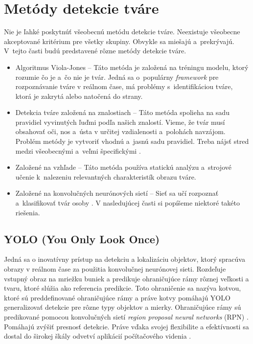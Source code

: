 \section{Metódy detekcie tváre}
Nie je ľahké poskytnúť všeobecnú metódu detekcie tváre. Neexistuje všeobecne akceptované kritérium pre všetky skupiny. Obvykle sa miešajú a~prekrývajú. V~tejto časti budú predstavené rôzne metódy detekcie tváre.
\begin{itemize}
    \item Algoritmus Viola-Jones \cite{viola_jones} -- Táto metóda je založená na tréningu modelu, ktorý rozumie čo je a~čo nie je tvár. Jedná sa o~populárny \textit{framework} pre rozpoznávanie tváre v reálnom čase, má problémy s~identifikáciou tváre, ktorá je zakrytá alebo natočená do strany.
    \item Detekcia tváre založená na znalostiach -- Táto metóda spolieha na sadu pravidiel vyvinutých ľuďmi podľa našich znalostí. Vieme, že tvár musí obsahovať oči, nos a~ústa v určitej vzdialenosti a~polohách navzájom. Problém metódy je vytvoriť vhodnú a~jasnú sadu pravidiel. Treba nájsť stred medzi všeobecnými a~veľmi špecifickými \cite{face_rec_med}.
    \item Založené na vzhľade -- Táto metóda používa statickú analýzu a~strojové učenie k~nalezeniu relevantných charakteristík obrazu tváre.
    \item Založené na konvolučných neurónových sietí -- Sieť sa učí rozpoznať a~klasifikovať tvár osoby \cite{face_rec_med2,face_detect}. V nasledujúcej časti si popíšeme niektoré takéto riešenia.
\end{itemize}

\subsection{YOLO (You Only Look Once)}
Jedná sa o inovatívny prístup na detekciu a lokalizáciu objektov, ktorý spracúva obrazy v reálnom čase za použitia konvolučnej neurónovej sieti. Rozdeľuje vstupný obraz na mriežku buniek a predikuje ohraničujúce rámy rôznej veľkosti a tvaru, ktoré slúžia ako referencia predikcie. Toto ohraničenie sa nazýva kotvou, ktoré sú preddefinované ohraničujúce rámy a práve kotvy pomáhajú YOLO generalizovať detekcie pre rôzne typy objektov a mierky. Ohraničujúce rámy sú predikované pomocou konvolučných sietí \textit{region proposal neural networks} (RPN) \cite{rpn}. Pomáhajú zvýšiť presnosť detekcie. Práve vďaka svojej flexibilite a efektívnosti sa dostal do širokej škály odvetví aplikácií počítačového videnia \cite{yolo,yolo_stranka}.

